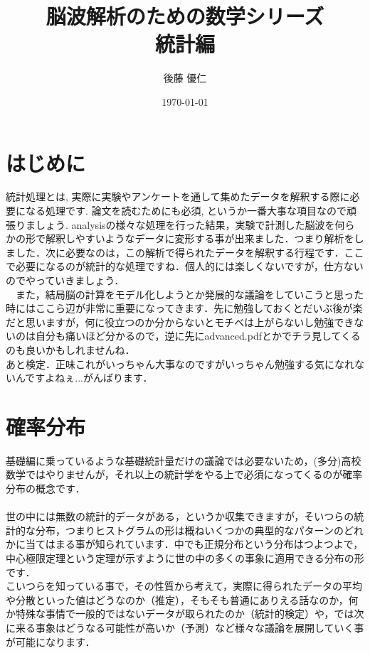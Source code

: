 \documentclass[11pt,a4paper]{ujreport} 	%
\title{脳波解析のための数学シリーズ\\
統計編}
\author{後藤 優仁}
\date{\today}
\begin{document}
\maketitle

\newpage
%
%
\tableofcontents
\newpage
\chapter{はじめに}
 統計処理とは, 実際に実験やアンケートを通して集めたデータを解釈する際に必要になる処理です. 論文を読むためにも必須, というか一番大事な項目なので頑張りましょう. analysisの様々な処理を行った結果，実験で計測した脳波を何らかの形で解釈しやすいようなデータに変形する事が出来ました．つまり解析をしました．次に必要なのは，この解析で得られたデータを解釈する行程です．ここで必要になるのが統計的な処理ですね．個人的には楽しくないですが，仕方ないのでやっていきましょう．\\
 　また，結局脳の計算をモデル化しようとか発展的な議論をしていこうと思った時にはここら辺が非常に重要になってきます．先に勉強しておくとだいぶ後が楽だと思いますが，何に役立つのか分からないとモチベは上がらないし勉強できないのは自分も痛いほど分かるので，逆に先にadvanced.pdfとかでチラ見してくるのも良いかもしれませんね．\\

あと検定．正味これがいっちゃん大事なのですがいっちゃん勉強する気になれないんですよねぇ...がんばります．
 
 \newpage
 
 
\chapter{確率分布}
基礎編に乗っているような基礎統計量だけの議論では必要ないため，(多分)高校数学ではやりませんが，それ以上の統計学をやる上で必須になってくるのが確率分布の概念です．\\
\\

世の中には無数の統計的データがある，というか収集できますが，そいつらの統計的な分布，つまりヒストグラムの形は概ねいくつかの典型的なパターンのどれかに当てはまる事が知られています．中でも正規分布という分布はつよつよで，中心極限定理という定理が示すように世の中の多くの事象に適用できる分布の形です．\\

こいつらを知っている事で，その性質から考えて，実際に得られたデータの平均や分散といった値はどうなのか（推定），そもそも普通にありえる話なのか，何か特殊な事情で一般的ではないデータが取られたのか（統計的検定）や，では次に来る事象はどうなる可能性が高いか（予測）など様々な議論を展開していく事が可能になります．\\
\end{document}
